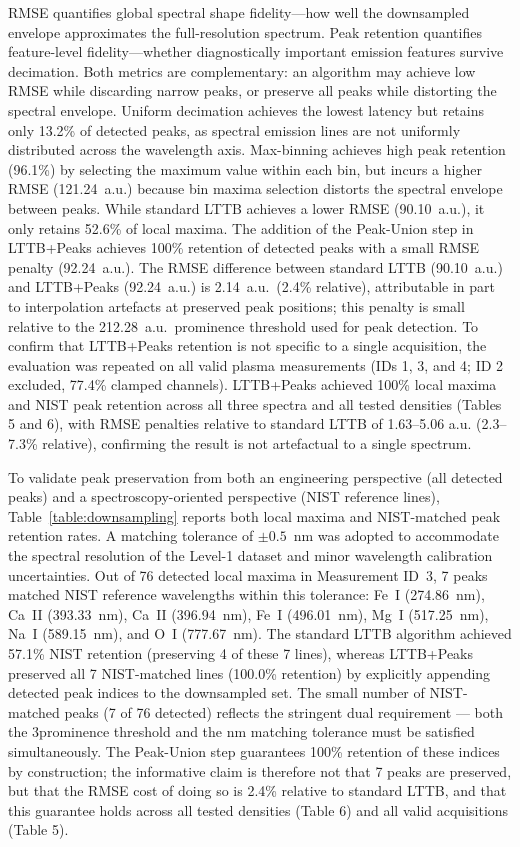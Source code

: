 \documentclass[final,5p,twocolumn,a4paper]{elsarticle}
\begin{document}
RMSE quantifies global spectral shape fidelity---how well the downsampled envelope approximates the full-resolution spectrum. Peak retention quantifies feature-level fidelity---whether diagnostically important emission features survive decimation. Both metrics are complementary: an algorithm may achieve low RMSE while discarding narrow peaks, or preserve all peaks while distorting the spectral envelope. Uniform decimation achieves the lowest latency but retains only 13.2\% of detected peaks, as spectral emission lines are not uniformly distributed across the wavelength axis. Max-binning achieves high peak retention (96.1\%) by selecting the maximum value within each bin, but incurs a higher RMSE (121.24~a.u.) because bin maxima selection distorts the spectral envelope between peaks. While standard LTTB achieves a lower RMSE (90.10~a.u.), it only retains 52.6\% of local maxima. The addition of the Peak-Union step in LTTB+Peaks achieves 100\% retention of detected peaks with a small RMSE penalty (92.24~a.u.). The RMSE difference between standard LTTB (90.10~a.u.) and LTTB+Peaks (92.24~a.u.) is 2.14~a.u.\ (2.4\% relative), attributable in part to interpolation artefacts at preserved peak positions; this penalty is small relative to the 212.28~a.u.\ prominence threshold used for peak detection. To confirm that LTTB+Peaks retention is not specific to a single acquisition, the evaluation was repeated on all valid plasma measurements (IDs 1, 3, and 4; ID 2 excluded, 77.4\% clamped channels). LTTB+Peaks achieved 100\% local maxima and NIST peak retention across all three spectra and all tested densities (Tables 5 and 6), with RMSE penalties relative to standard LTTB of 1.63–5.06 a.u. (2.3–7.3\% relative), confirming the result is not artefactual to a single spectrum.

To validate peak preservation from both an engineering perspective (all detected peaks) and a spectroscopy-oriented perspective (NIST reference lines), Table~\ref{table:downsampling} reports both local maxima and NIST-matched peak retention rates. A matching tolerance of $\pm0.5$~nm was adopted to accommodate the spectral resolution of the Level-1 dataset and minor wavelength calibration uncertainties. Out of 76 detected local maxima in Measurement ID~3, 7 peaks matched NIST reference wavelengths within this tolerance: Fe~I (274.86~nm), Ca~II (393.33~nm), Ca~II (396.94~nm), Fe~I (496.01~nm), Mg~I (517.25~nm), Na~I (589.15~nm), and O~I (777.67~nm). The standard LTTB algorithm achieved 57.1\% NIST retention (preserving 4 of these 7 lines), whereas LTTB+Peaks preserved all 7 NIST-matched lines (100.0\% retention) by explicitly appending detected peak indices to the downsampled set. The small number of NIST-matched peaks (7 of 76 detected) reflects the stringent dual requirement — both the 3\sigma prominence threshold and the  nm matching tolerance must be satisfied simultaneously. The Peak-Union step guarantees 100\% retention of these indices by construction; the informative claim is therefore not that 7 peaks are preserved, but that the RMSE cost of doing so is 2.4\% relative to standard LTTB, and that this guarantee holds across all tested densities (Table 6) and all valid acquisitions (Table 5).
\end{document}
